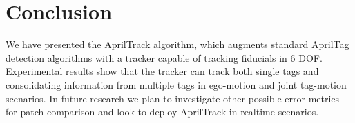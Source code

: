 \documentclass[letterpaper, 10 pt, conference]{ieeeconf}
\begin{document}
\section{Conclusion}

We have presented the AprilTrack algorithm, which augments standard AprilTag detection algorithms with a tracker capable of tracking fiducials in 6 DOF. Experimental results show that the tracker can track both single tags and consolidating information from multiple tags in ego-motion and joint tag-motion scenarios. In future research we plan to investigate other possible error metrics for patch comparison and look to deploy AprilTrack in realtime scenarios.


{}
\end{document}
